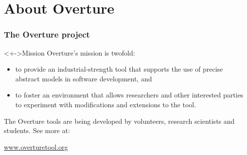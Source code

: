 \documentclass{beamer}
\begin{document}
\section{About Overture}
\frame
{
  \frametitle{The Overture project}

\begin{block}<+->{Mission}
Overture's mission is twofold: 
  \begin{itemize}
  \item<1-> to provide an industrial-strength tool that supports the use of precise abstract models in software development, and 
  \item<1-> to foster an environment that allows researchers and other interested parties to experiment with modifications and extensions to the tool.      

  \end{itemize}
\end{block}

The Overture tools are being developed by volunteers, research scientists and students. See more at:
\begin{center}
\href{www.overturetool.org}{www.overturetool.org}
\end{center}

}
\end{document}
